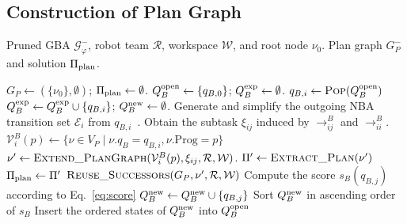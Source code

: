 \documentclass[lettersize,journal]{IEEEtran}
\theoremstyle{italiclemma}
\theoremstyle{italiclemma}
\theoremstyle{definition}
\begin{document}
\subsection{Construction of Plan Graph}  %
\begin{algorithm}[t]
\caption{\textsc{ConstructPlanGraph}}
\label{alg:otf_pg}
\begin{algorithmic}[1]
\REQUIRE Pruned GBA $\mathcal{G}^{-}_\varphi$, robot team $\mathcal R$, workspace $\mathcal W$, and root node $\nu_0$.
\ENSURE Plan graph $G_P^{-}$ and solution $\Pi_{\rm plan}$.

\STATE $G_P\gets(\{\nu_0\},\emptyset)$; $\Pi_{\rm plan}\gets\emptyset$.
\STATE  $Q_B^{\rm open} \leftarrow \{q_{B,0}\}$;
        $Q_B^{\rm exp}\gets\emptyset$.
    \STATE $q_{B,i}\leftarrow\textsc{Pop}(Q_B^{\rm open})$
    \STATE $Q_B^{\rm exp}\gets Q_B^{\rm exp}\cup\{q_{B,i}\}$; $Q_B^{\rm new}\leftarrow\emptyset$.
    \STATE Generate and simplify the outgoing NBA transition set $\mathcal{E}_i$ from $q_{B,i}$~\cite{Gastin2001FastLT}.
    \STATE Obtain the subtask $\xi_{ij}$ induced by $\rightarrow^B_{ij}$ and  $\rightarrow^B_{ii}$.
    \STATE $\mathcal V^B_i(p) \gets\{\nu\in V_P\mid \nu.q_B=q_{B,i}, \nu.\mathrm{Prog}=p\}$
        \STATE $\nu'\gets \textsc{Extend\_PlanGraph}(\mathcal V^B_i(p),\xi_{ij}, \mathcal R,\mathcal W)$.
                \STATE {}
            \ENDIF
                \STATE $\Pi'\leftarrow\textsc{Extract\_Plan}(\nu')$
                    \STATE $\Pi_{\rm plan}\leftarrow\Pi'$
                \ENDIF
                \STATE {}
            \ENDIF
                 \STATE $\textsc{Reuse\_Successors}
                 (G_P,\nu',\mathcal R,\mathcal W)$
          \ELSE
            \STATE Compute the  score ${s}_B(q_{B,j})$  according to Eq.~\eqref{eq:score}
            \STATE $Q_B^{\rm new}\gets Q_B^{\rm new}\cup\{q_{B,j}\}$
           \ENDIF
        \ENDFOR
        \ENDFOR
        \STATE Sort $Q_B^{\rm new}$ in ascending order of $s_B$
        \STATE Insert the ordered states of $Q_B^{\rm new}$
into $Q_B^{\rm open}$


\end{algorithmic}
\end{algorithm}
\end{document}
